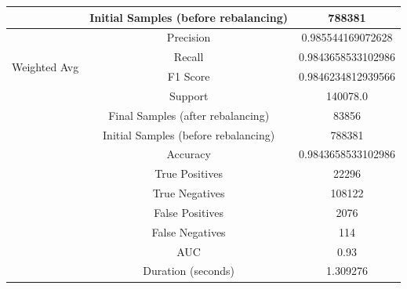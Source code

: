 \begin{longtable}{|c|c|c|}
 & Initial Samples (before rebalancing) & 788381 \\
\hline
\multirow{4}{*}{Weighted Avg} & Precision & 0.985544169072628 \\
 & Recall & 0.9843658533102986 \\
 & F1 Score & 0.9846234812939566 \\
 & Support & 140078.0 \\
 & Final Samples (after rebalancing) & 83856 \\
 & Initial Samples (before rebalancing) & 788381 \\
\hline
& Accuracy & 0.9843658533102986 \\ \hline
& True Positives & 22296 \\ \hline
& True Negatives & 108122 \\ \hline
& False Positives & 2076 \\ \hline
& False Negatives & 114 \\ \hline
& AUC & 0.93 \\ \hline
& Duration (seconds) & 1.309276 \\ \hline
\end{longtable}



